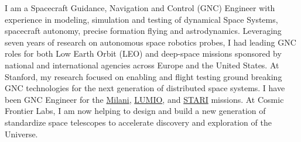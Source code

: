 \documentclass[
	a4paper,
	sidecolor=gray!8,
	sectioncolor=materialblue,
	subsectioncolor=materialindigo,
	sidebarwidth=0.27\paperwidth,
	profilepicsize=3.5cm,
	profilepicstyle=profilecircle,
	profilepiczoom=1.15,
]{sixtysecondscv}
\begin{document}
\makefrontsidebar


\normalsize

I am a Spacecraft Guidance, Navigation and Control (GNC) Engineer with experience in modeling, simulation and testing of dynamical Space Systems, spacecraft autonomy, precise formation flying and astrodynamics. Leveraging seven years of research on autonomous space robotics probes, I had leading GNC roles for both Low Earth Orbit (LEO) and deep-space missions sponsored by national and international agencies across Europe and the United States. At Stanford, my research focused on enabling and flight testing ground breaking GNC technologies for the next generation of distributed space systems. I have been GNC Engineer for the \href{https://tyvak.eu/missions/milani/}{\textcolor{materialblue}{Milani}}, \href{https://www.esa.int/Enabling_Support/Space_Engineering_Technology/Shaping_the_Future/LUMIO_New_CubeSat_Illuminating_Lunar_Impacts}{\textcolor{materialblue}{LUMIO}}, and \href{https://starimission.space/index.html}{\textcolor{materialblue}{STARI}} missions. At Cosmic Frontier Labs, I am now helping to design and build a new generation of standardize space telescopes to accelerate discovery and exploration of the Universe.

\end{document}
